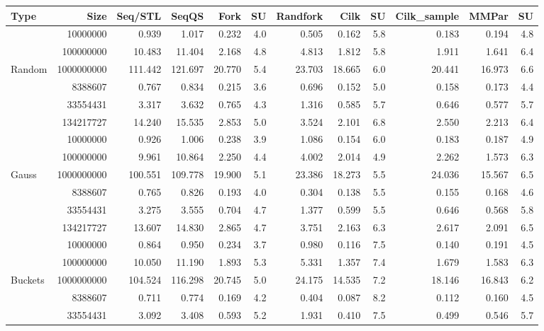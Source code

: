 \documentclass[preprint]{sigplanconf}
\begin{document}
\begin{table*}[t!]
\begin{center}
\begin{tabular}{|lr|rr|rrr|rrr||rr|}
\hline
Type & Size & Seq/STL & SeqQS & Fork & SU & Randfork & Cilk & SU & Cilk\_sample & MMPar & SU \\
\hline
 & 10000000 & 0.939 & 1.017 & 0.232 & 4.0 & 0.505 & 0.162 & 5.8 & 0.183 & 0.194 & 4.8 \\
 & 100000000 & 10.483 & 11.404 & 2.168 & 4.8 & 4.813 & 1.812 & 5.8 & 1.911 & 1.641 & 6.4 \\
Random & 1000000000 & 111.442 & 121.697 & 20.770 & 5.4 & 23.703 & 18.665 & 6.0 & 20.441 & 16.973 & 6.6 \\
 & 8388607 & 0.767 & 0.834 & 0.215 & 3.6 & 0.696 & 0.152 & 5.0 & 0.158 & 0.173 & 4.4 \\
 & 33554431 & 3.317 & 3.632 & 0.765 & 4.3 & 1.316 & 0.585 & 5.7 & 0.646 & 0.577 & 5.7 \\
 & 134217727 & 14.240 & 15.535 & 2.853 & 5.0 & 3.524 & 2.101 & 6.8 & 2.550 & 2.213 & 6.4 \\
\hline
 & 10000000 & 0.926 & 1.006 & 0.238 & 3.9 & 1.086 & 0.154 & 6.0 & 0.183 & 0.187 & 4.9 \\
 & 100000000 & 9.961 & 10.864 & 2.250 & 4.4 & 4.002 & 2.014 & 4.9 & 2.262 & 1.573 & 6.3 \\
Gauss & 1000000000 & 100.551 & 109.778 & 19.900 & 5.1 & 23.386 & 18.273 & 5.5 & 24.036 & 15.567 & 6.5 \\
 & 8388607 & 0.765 & 0.826 & 0.193 & 4.0 & 0.304 & 0.138 & 5.5 & 0.155 & 0.168 & 4.6 \\
 & 33554431 & 3.275 & 3.555 & 0.704 & 4.7 & 1.377 & 0.599 & 5.5 & 0.646 & 0.568 & 5.8 \\
 & 134217727 & 13.607 & 14.830 & 2.865 & 4.7 & 3.751 & 2.163 & 6.3 & 2.617 & 2.091 & 6.5 \\
\hline
 & 10000000 & 0.864 & 0.950 & 0.234 & 3.7 & 0.980 & 0.116 & 7.5 & 0.140 & 0.191 & 4.5 \\
 & 100000000 & 10.050 & 11.190 & 1.893 & 5.3 & 5.331 & 1.357 & 7.4 & 1.679 & 1.583 & 6.3 \\
Buckets & 1000000000 & 104.524 & 116.298 & 20.745 & 5.0 & 24.175 & 14.535 & 7.2 & 18.146 & 16.843 & 6.2 \\
 & 8388607 & 0.711 & 0.774 & 0.169 & 4.2 & 0.404 & 0.087 & 8.2 & 0.112 & 0.160 & 4.5 \\
 & 33554431 & 3.092 & 3.408 & 0.593 & 5.2 & 1.931 & 0.410 & 7.5 & 0.499 & 0.546 & 5.7 \\

\end{tabular}
\end{center}
\end{table*}
\end{document}
